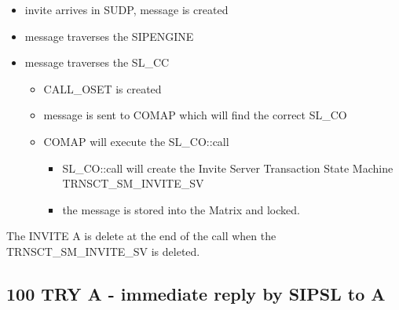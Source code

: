 \documentclass[a4paper]{article}
\begin{document}
\begin {itemize}
\item invite arrives in SUDP, message is created
\item message traverses the SIPENGINE
\item message traverses the SL\_CC
\begin {itemize}
\item CALL\_OSET is created
\item message is sent to COMAP which will find the correct SL\_CO
\item COMAP will execute the SL\_CO::call
\begin {itemize}
\item SL\_CO::call will create the Invite Server Transaction State Machine TRNSCT\_SM\_INVITE\_SV
\item the message is stored into the Matrix and locked.
\end{itemize}
\end{itemize}
\end{itemize}

The INVITE A is delete at the end of the call when the TRNSCT\_SM\_INVITE\_SV is deleted.

\subsection{100 TRY A - immediate reply by SIPSL to A}
\end{document}
